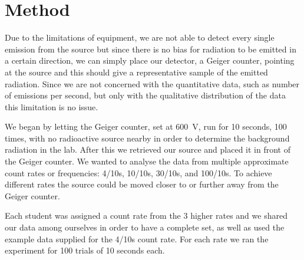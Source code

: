 \documentclass[12pt]{article}
\numberwithin{equation}{section}
\numberwithin{figure}{section}
\numberwithin{table}{section}
\begin{document}
\section{Method}\label{sec:Method}
\par Due to the limitations of equipment, we are not able to detect every single emission from the source but since there is no bias for radiation to be emitted in a certain direction, we can simply place our detector, a Geiger counter, pointing at the source and this should give a representative sample of the emitted radiation. Since we are not concerned with the quantitative data, such as number of emissions per second, but only with the qualitative distribution of the data this limitation is no issue. 
\par We began by letting the Geiger counter, set at \SI{600}{\volt}, run for 10 seconds, 100 times, with no radioactive source nearby in order to determine the background radiation in the lab. After this we retrieved our  source and placed it in front of the Geiger counter. We wanted to analyse the data from multiple approximate count rates or frequencies: 4/10s, 10/10s, 30/10s, and 100/10s. To achieve different rates the source could be moved closer to or further away from the Geiger counter.
\par Each student was assigned a count rate from the 3 higher rates and we shared our data among ourselves in order to have a complete set, as well as used the example data supplied for the 4/10s count rate. For each rate we ran the experiment for 100 trials of 10 seconds each.
\end{document}
